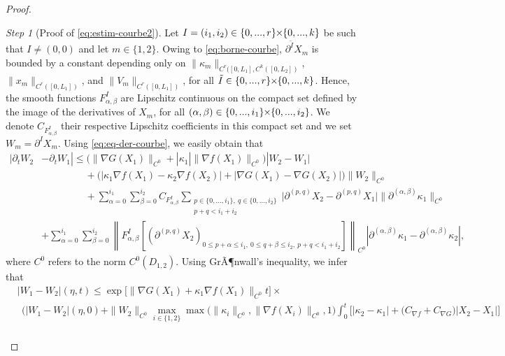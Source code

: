 \documentclass{article}
\newcommand{\DI}{\partial^I}
\newcommand{\PLH}{{\mkern-1mu\times\mkern-1mu}}
\newcommand{\Times}{\PLH}
\newcommand{\ko}{\kappa}
\theoremstyle{remark}
\theoremstyle{prpart}
\newtheorem{proofpart}{Step}
\begin{document}
\begin{proof}
\begin{proofpart}[Proof of \eqref{eq:estim-courbe2}]\label{step:control}
  Let $I=(i_1,i_2)\in\{0,...,r\}\Times\{0,...,k\}$ be such that $I\neq(0,0)$ and let $m\in\{1,2\}$. Owing to \eqref{eq:borne-courbe}, $\partial^{\tilde I} X_m$ is bounded by a constant depending only on $\|\ko_m\|_{C^r([0,L_1],C^k([0,L_2])}$, $\|x_m\|_{C^r([0,L_1])}$, and $\|V_m\|_{C^r([0,L_1])}$, for all $\tilde I\in\{0,...,r\}\Times\{0,...,k\}$. Hence, the smooth functions $F_{\alpha,\beta}^I$ are Lipschitz continuous on the compact set defined by the image of the derivatives of $X_m$, for all $(\alpha,\beta)\in\{0,...,i_1\}\Times\{0,...,i_2\}$. We denote $C_{F_{\alpha,\beta}^I}$ their respective Lipschitz coefficients in this compact set and we set $W_m=\DI X_m$. Using \eqref{eq:eq-der-courbe}, we easily obtain that
\small
\begin{equation*}%
  \begin{split}
|\partial_t W_2& - \partial_t W_1| \leq \big(\|\nabla G(X_1)\|_{C^0}+|\ko_1|\|\nabla f(X_1)\|_{C^0}\big)|W_2-W_1| \\
&\qquad\qquad~~+ \Big(\big|\ko_1\nabla f(X_1)-\ko_2\nabla f(X_2)\big|+\big|\nabla G(X_1)-\nabla G(X_2)\big|\Big)\|W_2\|_{C^0}\\
&\qquad\qquad~~+ \sum_{\alpha=0}^{i_1}\sum_{\beta=0}^{i_2} C_{F^I_{\alpha,\beta}}\sum_{\substack{p\in\{0,...,i_1\},~q\in\{0,...,i_2\}\\p+q<i_1+i_2}}\big|\partial^{(p,q)}X_2-\partial^{(p,q)} X_1\big| \|\partial^{(\alpha,\beta)}\ko_1\|_{C^0}\\
&+\sum_{\alpha=0}^{i_1}\sum_{\beta=0}^{i_2} \left\|F^I_{\alpha,\beta}\left[(\partial^{(p,q)}X_2)_{0\leq p+\alpha \leq i_1,~0\leq q+\beta\leq i_2,~p+q<i_1+i_2}\right]\right\|_{C^0}|\partial^{(\alpha,\beta)}\ko_1-\partial^{(\alpha,\beta)}\ko_2|,
\end{split}
\end{equation*}
\normalsize
where $C^0$ refers to the norm $C^0(D_{1,2})$. Using GrÃ¶nwall's inequality, we infer that
\small
\begin{align*}
  &|W_1-W_2|(\eta,t)\leq \exp\big[\|\nabla G(X_1) +\ko_1\nabla f(X_1)\|_{C^0}t\big]\times\\
  &~~\bigg( |W_1-W_2|(\eta,0) + \|W_2\|_{C^0}\max_{i\in\{1,2\}}\max\big(\|\ko_i\|_{C^0},\|\nabla f(X_i)\|_{C^0},1\big) \int_0^t\big[|\ko_2-\ko_1|{+}\big(C_{\nabla f}{+}C_{\nabla G}\big)|X_2-X_1|\big]\\

\end{align*}
\end{proofpart}
\end{proof}
\end{document}
